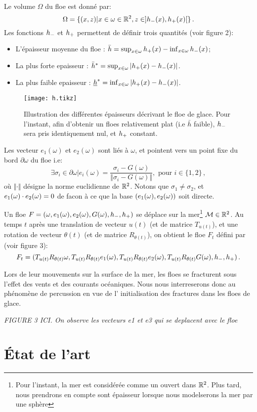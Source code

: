 Le volume $\Omega$ du floe est donné par:
\[
    \Omega = \{(x,z) | x \in \omega \in \mathbb{R}^2, z \in ]h_{-}(x), h_{+}(x)[ \} \,.
\] 
Les fonctions $h_{-}$ et $h_{+}$ permettent de définir trois quantités (voir figure 2):
\begin{itemize}
    \item L'épaisseur moyenne du floe : $\bar{h} =  \sup_{x\in\omega}{h_{+}(x)} - \inf_{x\in\omega}{h_{-}(x)}$;
    \item La plus forte epaisseur : $\bar{h}^* = \sup_{x\in\omega}{ \vert h_{+}(x) - h_{-}(x) \vert}$. 
    \item La plus faible epaisseur : $\underline{h}^* = \inf_{x\in\omega}{ \vert h_{+}(x) - h_{-}(x) \vert} $. 
\end{itemize}

\begin{figure}
    \centering
    \texttt{[image: h.tikz]}
    \caption{Illustration des différentes épaisseurs décrivant le floe de glace. Pour l'instant, afin d'obtenir un floes relativement plat (i.e $\bar{h}$ faible), $h_{-}$ sera pris identiquement nul, et $h_{+}$ constant.}
\end{figure}

Les vecteur $e_1(\omega)$ et $e_2(\omega)$ sont liés à $\omega$, et pointent vers un point fixe du bord $\partial \omega$ du floe i.e:
\[
    \exists \sigma_i \in \partial \omega | e_i(\omega) = \frac{\sigma_i - G(\omega)}{\Vert \sigma_i - G(\omega) \Vert}, \text{ pour } i \in \{1,2\} \,,
\]
où $\Vert \cdot \Vert$ désigne la norme euclidienne de $\mathbb{R}^2$. Notons que $\sigma_1 \neq \sigma_2$, et $e_1(\omega) \cdot e_2(\omega) = 0$ de facon à ce que la base $(e_1(\omega), e_2(\omega))$ soit directe.

Un floe $F = (\omega, e_1(\omega), e_2(\omega), G(\omega), h_{-}, h_{+})$ se déplace sur la mer\footnote{Pour l'instant, la mer est considérée comme un ouvert dans $\mathbb{R}^2$. Plus tard, nous prendrons en compte sont épaisseur lorsque nous modelserons la mer par une sphère} $\mathcal{M} \in \mathbb{R}^2$. Au temps $t$ après une translation de vecteur $u(t)$ (et de matrice $T_{u(t)}$), et une rotation de vecteur $\theta(t)$ (et de matrice $R_{\theta(t)}$), on obtient le floe $F_t$ défini par (voir figure 3):
\[
    F_t = (T_{u(t)}R_{\theta(t)}\omega, T_{u(t)}R_{\theta(t)}e_1(\omega), T_{u(t)}R_{\theta(t)}e_2(\omega), T_{u(t)}R_{\theta(t)}G(\omega), h_{-}, h_{+}) \,.
\]

Lors de leur mouvements sur la surface de la mer, les floes se fracturent sous l'effet des vents et des courants océaniques. Nous nous interreserons donc au phénomène de percussion en vue de l' initialisation des fractures dans les floes de glace.

\textit{FIGURE 3 ICI. On observe les vecteurs e1 et e3 qui se deplacent avec le floe}




\section{État de l'art}
